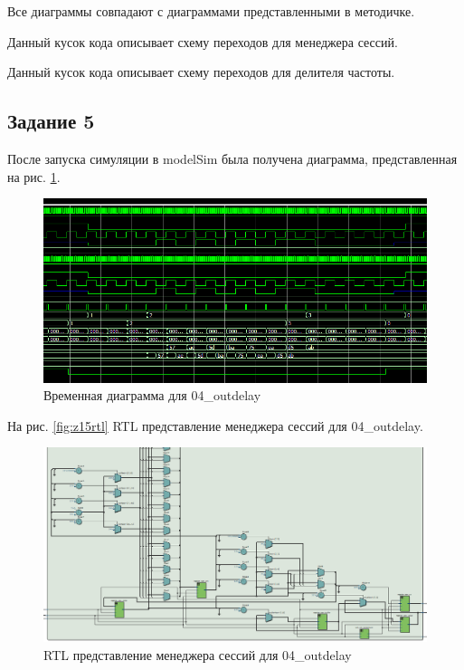 \documentclass[a4paper,14pt]{article}
\begin{document}
	Все диаграммы совпадают с диаграммами представленными в методичке.
	
	Данный кусок кода описывает схему переходов для менеджера сессий.
	
	{\small {}}

	Данный кусок кода описывает схему переходов для делителя частоты.
	
	{\small {}}
	
	\subsection{Задание 5}
	
	После запуска симуляции в modelSim была получена диаграмма, представленная на рис. \ref{fig:z5msimwvf}.
	
	\begin{figure}[H]
		\centering
		\includegraphics[width=0.7\linewidth]{images/z5_msim_wvf}
		\caption{Временная диаграмма для 04\_outdelay}
		\label{fig:z5msimwvf}
	\end{figure}
	
	На рис. \ref{fig:z15rtl} RTL представление менеджера сессий для 04\_outdelay.
	
	\begin{figure}[H]
		\centering
		\includegraphics[width=0.9\linewidth]{images/z5_rtl}
		\caption{RTL представление менеджера сессий для 04\_outdelay}
		\label{fig:z5rtl}
	\end{figure}
	
\end{document}
